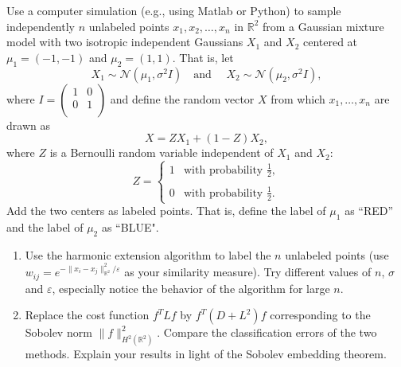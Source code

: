 \begin{myexercise}
Use a computer simulation (e.g., using Matlab or Python) to sample independently $n$ unlabeled points $x_1,x_2,\ldots,x_n$ in $\mathbb{R}^2$ from a Gaussian mixture model with two isotropic independent Gaussians $X_1$ and $X_2$ centered at $\mu_1=(-1,-1)$ and $\mu_2=(1,1)$. That is, let $$X_1\sim \mathcal{N}(\mu_1,\sigma^2I)\quad \mbox{and } \quad X_2 \sim \mathcal{N}(\mu_2,\sigma^2I),$$ where $I = \left(
                                                                                                                 \begin{array}{cc}
                                                                                                                   1 & 0 \\
                                                                                                                   0 & 1 \\
                                                                                                                 \end{array}
                                                                                                               \right)$ and define the random vector $X$ from which $x_1,\ldots,x_n$ are drawn as $$X=ZX_1+(1-Z)X_2,$$ where $Z$ is a Bernoulli random variable independent of $X_1$ and $X_2$:
    $$Z=\left\{\begin{array}{cc}
         1 & \mbox{with probability } \frac{1}{2}, \\
         &\\
         0 & \mbox{with probability } \frac{1}{2}.
       \end{array}\right.
    $$
Add the two centers as labeled points. That is, define the label of $\mu_1$ as ``RED'' and the label of $\mu_2$ as ``BLUE".
\begin{enumerate}
\item Use the harmonic extension algorithm to label the $n$ unlabeled points (use $w_{ij}=e^{-\|x_i-x_j\|^2_{\mathbb{R}^2}/\varepsilon}$ as your similarity measure). Try different values of $n$, $\sigma$ and $\varepsilon$, especially notice the behavior of the algorithm for large $n$.
\item Replace the cost function $f^T L f$ by $f^T(D+L^2)f$ corresponding to the Sobolev norm $\|f\|^2_{H^2(\mathbb{R}^2)}$. Compare the classification errors of the two methods. Explain your results in light of the Sobolev embedding theorem.
\end{enumerate}

    
\end{myexercise}



